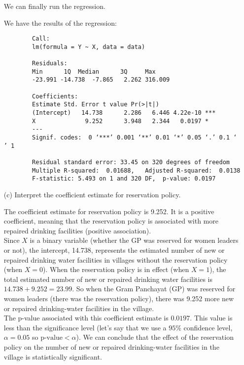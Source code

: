 \documentclass[12pt,letterpaper]{article}
\begin{document}
\begin{enumerate}
	We can finally run the regression. 

	
	
	\newpage
	We have the results of the regression: 
	
	\begin{verbatim}
		Call:
		lm(formula = Y ~ X, data = data)
		
		Residuals:
		Min      1Q  Median      3Q     Max 
		-23.991 -14.738  -7.865   2.262 316.009 
		
		Coefficients:
		Estimate Std. Error t value Pr(>|t|)    
		(Intercept)   14.738      2.286   6.446 4.22e-10 ***
		X              9.252      3.948   2.344   0.0197 *  
		---
		Signif. codes:  0 ‘***’ 0.001 ‘**’ 0.01 ‘*’ 0.05 ‘.’ 0.1 ‘ ’ 1
		
		Residual standard error: 33.45 on 320 degrees of freedom
		Multiple R-squared:  0.01688,   Adjusted R-squared:  0.0138 
		F-statistic: 5.493 on 1 and 320 DF,  p-value: 0.0197
	\end{verbatim}
	
	
	\vspace{0.5cm}
	\item [(c)] Interpret the coefficient estimate for reservation policy. 
	
	The coefficient estimate for reservation policy is 9.252. It is a positive coefficient, meaning that the reservation policy is associated with more repaired drinking facilities (positive association). \\
	Since \( X \) is a binary variable (whether the GP was reserved for women leaders or not), the intercept, 14.738, represents the estimated number of new or repaired drinking water facilities in villages without the reservation policy (when \( X = 0 \)). When the reservation policy is in effect (when \( X = 1 \)), the total estimated number of new or repaired drinking water facilities is \( 14.738 + 9.252 = 23.99 \). So when the Gram Panchayat (GP) was reserved for women leaders (there was the reservation policy), there was 9.252 more new or repaired drinking-water facilities in the village. \\
	The p-value associated with this coefficient estimate is \( 0.0197 \). This value is less than the significance level (let's say that we use a \( 95\% \) confidence level, \( \alpha = 0.05 \) so \( \text{p-value} < \alpha \)). We can conclude that the effect of the reservation policy on the number of new or repaired drinking-water facilities in the village is statistically significant.



	
\end{enumerate}
\end{document}
